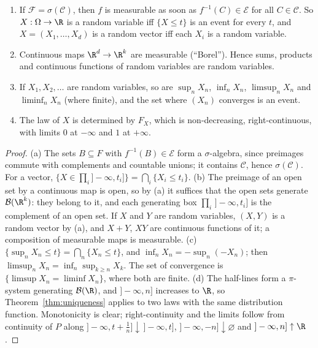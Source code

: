 \begin{proposition}\label{prop:measurable}
\begin{enumerate}[label=(\alph*)]
\item If $\mathcal F=\sigma(\mathcal C)$, then $f$ is measurable as soon as $f^{-1}(C)\in\mathcal E$ for all $C\in\mathcal C$. So $X:\Omega\to\R$ is a random variable iff
$\{X\le t\}$ is an event for every $t$, and $X=(X_1,\dots,X_d)$ is a random vector iff each $X_i$ is a random variable.
\item Continuous maps $\R^d\to\R^k$ are measurable (``Borel''). Hence sums, products and continuous functions of random
variables are random variables.
\item If $X_1,X_2,\ldots$ are random variables, so are $\sup_nX_n$, $\inf_nX_n$, $\limsup_nX_n$ and $\liminf_nX_n$ (where finite), and the set
where $(X_n)$ converges is an event.
\item The law of $X$ is determined by $F_X$, which is non-decreasing, right-continuous, with limits $0$ at $-\infty$ and $1$ at $+\infty$.
\end{enumerate}
\end{proposition}
\begin{proof}
(a) The sets $B\subseteq F$ with $f^{-1}(B)\in\mathcal E$ form a $\sigma$-algebra, since preimages commute with complements and countable
unions; it contains $\mathcal C$, hence $\sigma(\mathcal C)$. For a vector, $\{X\in\prod_i]-\infty,t_i]\}=\bigcap_i\{X_i\le t_i\}$.
(b) The preimage of an open set by a continuous map is open, so by (a) it suffices that the open sets generate
$\mathcal B(\R^k)$: they belong to it, and each generating box $\prod_i\,]-\infty,t_i]$ is the complement of an open set. If $X$ and $Y$ are random variables, $(X,Y)$ is a random
vector by (a), and $X+Y$, $XY$ are continuous functions of it; a composition of measurable maps is measurable.
(c) $\{\sup_nX_n\le t\}=\bigcap_n\{X_n\le t\}$, and $\inf_nX_n=-\sup_n(-X_n)$; then $\limsup_n X_n=\inf_n\sup_{k\ge n}X_k$. The set of convergence is
$\{\limsup X_n=\liminf X_n\}$, where both are finite.
(d) The half-lines form a $\pi$-system generating $\mathcal B(\R)$, and $]-\infty,n]$ increases to $\R$, so Theorem~\ref{thm:uniqueness} applies to two
laws with the same distribution function. Monotonicity is clear; right-continuity and the limits follow from continuity of $P$ along
$]-\infty,t+\frac1n]\downarrow\,]-\infty,t]$, $]-\infty,-n]\downarrow\varnothing$ and $]-\infty,n]\uparrow\R$.
\end{proof}

